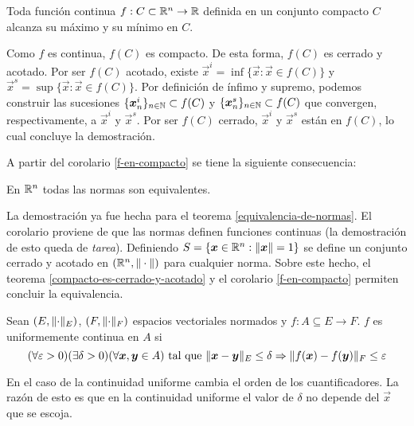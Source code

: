 \begin{corolario}\label{f-en-compacto}
Toda funci\'on continua $f:C\subset \mathbb{R}^n \to \mathbb{R}$ definida en un conjunto compacto $C$ alcanza su m\'aximo y su m\'inimo en $C$.
\end{corolario}

\begin{demostracion} Como $f$ es continua, $f(C)$ es compacto. De esta forma, $f(C)$ es cerrado y acotado. Por ser $f(C)$ acotado, existe $\vec{x}^i=\inf \{\vec{x}:\vec{x}\in f(C)\}$ y $\vec{x}^s=\sup \{\vec{x}:\vec{x}\in f(C)\}$. Por definici\'on de \'infimo y supremo, podemos construir las sucesiones $\{\boldsymbol{x}_n^i\}_{n\in \mathbb{N}} \subset f(C)$ y $\{\boldsymbol{x}_n^s\}_{n\in \mathbb{N}} \subset f(C)$ que convergen, respectivamente, a $\vec{x}^i$ y $\vec{x}^s$. Por ser $f(C)$ cerrado, $\vec{x}^i$ y $\vec{x}^s$ est\'an en $f(C)$, lo cual concluye la demostraci\'on. 
\end{demostracion}

A partir del corolario \ref{f-en-compacto} se tiene la siguiente consecuencia:

\begin{corolario} 
En $\mathbb{R}^n$ todas las normas son equivalentes.
\end{corolario}

\begin{demostracion}
La demostraci\'on ya fue hecha para el teorema \ref{equivalencia-de-normas}. El corolario proviene de que las normas definen funciones continuas (la demostraci\'on de esto queda de \emph{tarea}). Definiendo $S=\{\boldsymbol{x}\in \mathbb{R}^n : \|\boldsymbol{x}\|=1\}$ se define un conjunto cerrado y acotado en $(\mathbb{R}^n,\|\cdot\|)$ para cualquier norma. Sobre este hecho, el teorema \ref{compacto-es-cerrado-y-acotado} y el corolario \ref{f-en-compacto} permiten concluir la equivalencia. 
\end{demostracion}

\begin{definicion}
Sean $(E,\lVert\cdot\rVert_E)$, $(F,\lVert\cdot\rVert_F)$ espacios vectoriales normados y $f:A\subseteq E\to F$. $f$ es uniformemente continua en $A$ si
$$(\forall \varepsilon >0)(\exists \delta >0)(\forall \boldsymbol{x},\boldsymbol{y}\in A) \text{ tal que } \lVert\boldsymbol{x}-\boldsymbol{y}\rVert_E \leq \delta \Rightarrow \lVert f(\boldsymbol{x})-f(\boldsymbol{y})\rVert_F \leq \varepsilon$$
\end{definicion}

\begin{nota}
En el caso de la continuidad uniforme cambia el orden de los cuantificadores. La raz\'on de esto es que en la continuidad uniforme el valor de $\delta$ no depende del $\vec{x}$ que se escoja. 
\end{nota}

